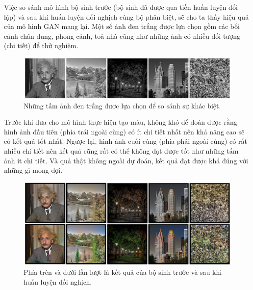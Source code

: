 \documentclass[a4paper, 12pt]{article}
\begin{document}
Việc so sánh mô hình bộ sinh trước (bộ sinh đã được qua tiền huấn luyện đối lập) và sau khi huấn luyện đối nghịch cùng bộ phân biệt, sẽ cho ta thấy hiệu quả của mô hình GAN mang lại. Một số ảnh đen trắng được lựa chọn gồm các bối cảnh chân dung, phong cảnh, toà nhà cũng như những ảnh có nhiều đối tượng (chi tiết) để thử nghiệm.

\begin{figure}[!h]
\captionsetup{width=0.8\textwidth}
\centering
\includegraphics[width=15cm]{images/4_2.PNG}
\caption{Những tấm ảnh đen trắng được lựa chọn để so sánh sự khác biệt.}
\end{figure}

\noindent
Trước khi đưa cho mô hình thực hiện tạo màu, không khó để đoán được rằng hình ảnh đầu tiên (phía trái ngoài cùng) có ít chi tiết nhất nên khả năng cao sẽ có kết quả tốt nhất. Ngược lại, hình ảnh cuối cùng (phía phải ngoài cùng) có rất nhiều chi tiết nên kết quả cũng rất có thể không đạt được tốt như những tấm ảnh ít chi tiết. Và quả thật không ngoài dự đoán, kết quả đạt được khá đúng với những gì mong đợi.

\begin{figure}[!h]
\captionsetup{width=0.8\textwidth}
\centering
\includegraphics[width=15cm]{images/4_3.PNG}
\caption{Phía trên và dưới lần lượt là kết quả của bộ sinh trước và sau khi huấn luyện đối nghịch.}
\label{fig:comparesimpleandgan}
\end{figure}
\end{document}
